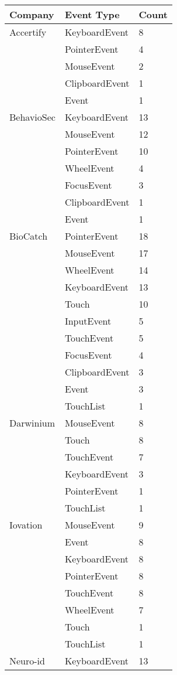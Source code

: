 \begin{table}[h]
\centering
\begin{tabular}{|l|l|l|}
\hline
Company & Event Type & Count \\
\hline
Accertify & KeyboardEvent & 8 \\
 & PointerEvent & 4 \\
 & MouseEvent & 2 \\
 & ClipboardEvent & 1 \\
 & Event & 1 \\
\hline
BehavioSec & KeyboardEvent & 13 \\
 & MouseEvent & 12 \\
 & PointerEvent & 10 \\
 & WheelEvent & 4 \\
 & FocusEvent & 3 \\
 & ClipboardEvent & 1 \\
 & Event & 1 \\
\hline
BioCatch & PointerEvent & 18 \\
 & MouseEvent & 17 \\
 & WheelEvent & 14 \\
 & KeyboardEvent & 13 \\
 & Touch & 10 \\
 & InputEvent & 5 \\
 & TouchEvent & 5 \\
 & FocusEvent & 4 \\
 & ClipboardEvent & 3 \\
 & Event & 3 \\
 & TouchList & 1 \\
\hline
Darwinium & MouseEvent & 8 \\
 & Touch & 8 \\
 & TouchEvent & 7 \\
 & KeyboardEvent & 3 \\
 & PointerEvent & 1 \\
 & TouchList & 1 \\
\hline
Iovation & MouseEvent & 9 \\
 & Event & 8 \\
 & KeyboardEvent & 8 \\
 & PointerEvent & 8 \\
 & TouchEvent & 8 \\
 & WheelEvent & 7 \\
 & Touch & 1 \\
 & TouchList & 1 \\
\hline
Neuro-id & KeyboardEvent & 13 \\

\end{tabular}
\end{table}
